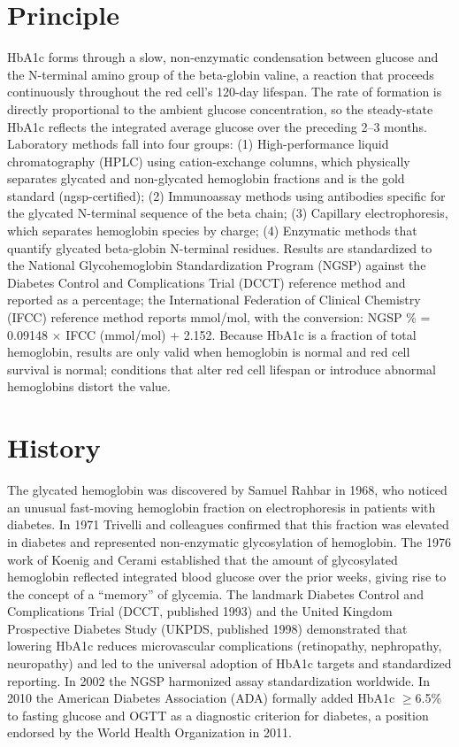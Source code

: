 \section*{Principle}
HbA1c forms through a slow, non-enzymatic condensation between glucose and the N-terminal amino group of the beta-globin valine, a reaction that proceeds continuously throughout the red cell's 120-day lifespan. The rate of formation is directly proportional to the ambient glucose concentration, so the steady-state HbA1c reflects the integrated average glucose over the preceding 2--3 months. Laboratory methods fall into four groups: (1) High-performance liquid chromatography (HPLC) using cation-exchange columns, which physically separates glycated and non-glycated hemoglobin fractions and is the gold standard (ngsp-certified); (2) Immunoassay methods using antibodies specific for the glycated N-terminal sequence of the beta chain; (3) Capillary electrophoresis, which separates hemoglobin species by charge; (4) Enzymatic methods that quantify glycated beta-globin N-terminal residues. Results are standardized to the National Glycohemoglobin Standardization Program (NGSP) against the Diabetes Control and Complications Trial (DCCT) reference method and reported as a percentage; the International Federation of Clinical Chemistry (IFCC) reference method reports mmol/mol, with the conversion: NGSP \% = 0.09148 $\times$ IFCC (mmol/mol) + 2.152. Because HbA1c is a fraction of total hemoglobin, results are only valid when hemoglobin is normal and red cell survival is normal; conditions that alter red cell lifespan or introduce abnormal hemoglobins distort the value.

\section*{History}
The glycated hemoglobin was discovered by Samuel Rahbar in 1968, who noticed an unusual fast-moving hemoglobin fraction on electrophoresis in patients with diabetes. In 1971 Trivelli and colleagues confirmed that this fraction was elevated in diabetes and represented non-enzymatic glycosylation of hemoglobin. The 1976 work of Koenig and Cerami established that the amount of glycosylated hemoglobin reflected integrated blood glucose over the prior weeks, giving rise to the concept of a ``memory'' of glycemia. The landmark Diabetes Control and Complications Trial (DCCT, published 1993) and the United Kingdom Prospective Diabetes Study (UKPDS, published 1998) demonstrated that lowering HbA1c reduces microvascular complications (retinopathy, nephropathy, neuropathy) and led to the universal adoption of HbA1c targets and standardized reporting. In 2002 the NGSP harmonized assay standardization worldwide. In 2010 the American Diabetes Association (ADA) formally added HbA1c $\geq$6.5\% to fasting glucose and OGTT as a diagnostic criterion for diabetes, a position endorsed by the World Health Organization in 2011.

